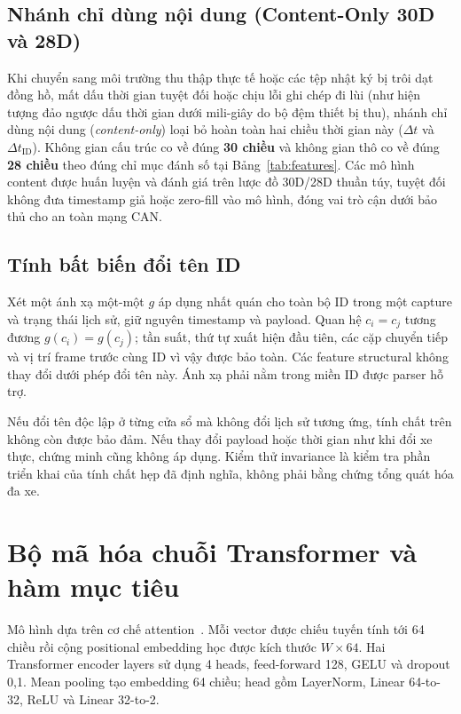 \documentclass[12pt, a4paper, reqno, oneside]{book}
\begin{document}
\subsection{Nhánh chỉ dùng nội dung (Content-Only 30D và 28D)}\label{subsec:content-features-def}
Khi chuyển sang môi trường thu thập thực tế hoặc các tệp nhật ký bị trôi dạt đồng hồ, mất dấu thời gian tuyệt đối hoặc chịu lỗi ghi chép đi lùi (như hiện tượng đảo ngược dấu thời gian dưới mili-giây do bộ đệm thiết bị thu), nhánh chỉ dùng nội dung (\textit{content-only}) loại bỏ hoàn toàn hai chiều thời gian này ($\Delta t$ và $\Delta t_{\text{ID}}$). Không gian cấu trúc co về đúng \textbf{30 chiều} và không gian thô co về đúng \textbf{28 chiều} theo đúng chỉ mục đánh số tại Bảng~\ref{tab:features}. Các mô hình content được huấn luyện và đánh giá trên lược đồ 30D/28D thuần túy, tuyệt đối không đưa timestamp giả hoặc zero-fill vào mô hình, đóng vai trò cận dưới bảo thủ cho an toàn mạng CAN.

\subsection{Tính bất biến đổi tên ID}
Xét một ánh xạ một-một $g$ áp dụng nhất quán cho toàn bộ ID trong một capture và trạng thái lịch sử, giữ nguyên timestamp và payload. Quan hệ $c_i=c_j$ tương đương $g(c_i)=g(c_j)$; tần suất, thứ tự xuất hiện đầu tiên, các cặp chuyển tiếp và vị trí frame trước cùng ID vì vậy được bảo toàn. Các feature structural không thay đổi dưới phép đổi tên này. Ánh xạ phải nằm trong miền ID được parser hỗ trợ.

Nếu đổi tên độc lập ở từng cửa sổ mà không đổi lịch sử tương ứng, tính chất trên không còn được bảo đảm. Nếu thay đổi payload hoặc thời gian như khi đổi xe thực, chứng minh cũng không áp dụng. Kiểm thử invariance là kiểm tra phần triển khai của tính chất hẹp đã định nghĩa, không phải bằng chứng tổng quát hóa đa xe.

\section{Bộ mã hóa chuỗi Transformer và hàm mục tiêu}\label{sec:transformer-encoder}
Mô hình dựa trên cơ chế attention~\cite{vaswani2017attention}. Mỗi vector được chiếu tuyến tính tới 64 chiều rồi cộng positional embedding học được kích thước $W\times64$. Hai Transformer encoder layers sử dụng 4 heads, feed-forward 128, GELU và dropout 0,1. Mean pooling tạo embedding 64 chiều; head gồm LayerNorm, Linear 64-to-32, ReLU và Linear 32-to-2.
\end{document}
